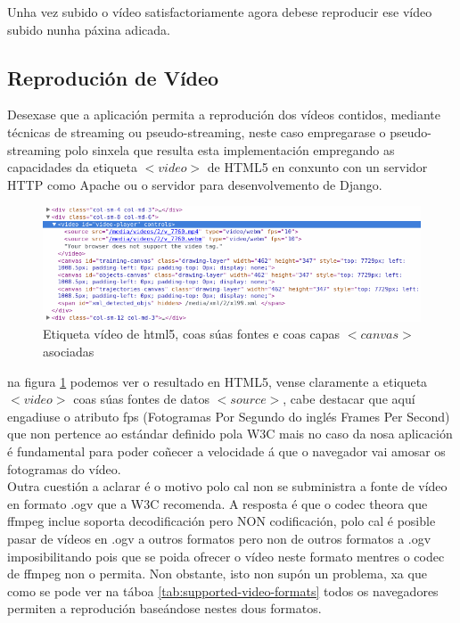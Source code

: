         
        Unha vez subido o vídeo satisfactoriamente agora debese reproducir ese vídeo subido nunha 
        páxina adicada.
            
    \subsection{Reprodución de Vídeo}
        Desexase que a aplicación permita a reprodución dos vídeos contidos, mediante técnicas de
        streaming ou pseudo-streaming, neste caso empregarase o pseudo-streaming polo sinxela que
        resulta esta implementación empregando as capacidades da etiqueta $<video>$ de HTML5 en conxunto
        con un servidor HTTP como Apache ou o servidor para desenvolvemento de Django.

        \begin{figure}[htp]
        \begin{center}
            \includegraphics[scale=0.55]{figures/VideoTagHtml5.png}
            \caption{Etiqueta vídeo de html5, coas súas fontes e coas capas $<canvas>$ asociadas}
        \label{fig:VideoTagHtml5}
        \end{center}
        \end{figure}
        
        na figura \ref{fig:VideoTagHtml5} podemos ver o resultado en HTML5, vense claramente a etiqueta
        $<video>$ coas súas fontes de datos $<source>$, cabe destacar que aquí engadiuse o atributo fps
        (Fotogramas Por Segundo do inglés Frames Per Second) que non pertence ao estándar definido pola 
        W3C\cite{w3schools-source-tag} mais no caso da nosa aplicación é fundamental para poder coñecer 
        a velocidade á que o navegador vai amosar os fotogramas do vídeo.\\
        
        Outra cuestión a aclarar é o motivo polo cal non se subministra a fonte de vídeo en formato
        .ogv que a W3C recomenda. A resposta é que o codec theora que ffmpeg inclue soporta 
        decodificación pero NON codificación, polo cal é posible pasar de vídeos en .ogv a outros 
        formatos pero non de outros formatos a .ogv imposibilitando pois que se poida ofrecer o 
        vídeo neste formato mentres o codec de ffmpeg non o permita. Non obstante, isto non supón un 
        problema, xa que como se pode ver na táboa \ref{tab:supported-video-formats} todos os navegadores
        permiten a reprodución baseándose nestes dous formatos.
        
